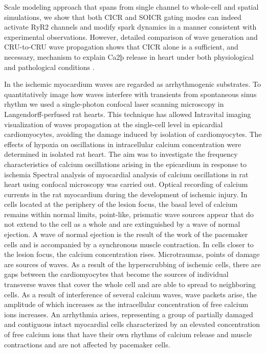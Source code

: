 \documentclass{biophys-new}
\begin{document}
Scale modeling approach that spans from single channel to whole-cell and spatial
simulations, we show that both CICR and SOICR gating modes can indeed activate RyR2 channels and modify  spark dynamics in a manner consistent
with experimental observations.
However, detailed comparison of  wave
generation and CRU-to-CRU  wave propagation shows that CICR alone
is a sufficient, and necessary, mechanism to explain Ca2þ release in heart under
both physiological and pathological conditions
\cite{williams2017does}.


In the ischemic myocardium  waves are regarded as arrhythmogenic substrates.
To quantitatively image how  waves interfere with  transients from spontaneous sinus rhythm we used a single-photon confocal laser scanning microscopy in Langendorff-perfused rat hearts.
This technique has allowed Intravital imaging visualization of  waves propagation at the single-cell level in epicardial cardiomyocytes, avoiding the damage induced by isolation of cardiomyocytes.
The effects of hypoxia on oscillations in intracellular calcium concentration  were determined in isolated rat heart.
The aim was to investigate the frequency characteristics of calcium oscillations arising in the epicardium in response to ischemia
Spectral  analysis of myocardial analysis of calcium oscillations in rat heart using confocal microscopy was carried out.
Optical recording of calcium currents in the rat myocardium during the development of ischemic injury.
In cells located at the periphery of the lesion focus, the basal level of calcium remains within normal limits, point-like, prismatic wave sources appear that do not extend to the cell as a whole and are extinguished by a wave of normal ejection.
A wave of normal ejection is the result of the work of the pacemaker cells and is accompanied by a synchronous muscle contraction.
In cells closer to the lesion focus, the calcium concentration rises.
Microtraumas, points of damage are sources of waves.
As a result of the hyperscrubbing of ischemic cells, there are gaps between the cardiomyocytes that become the sources of individual transverse waves that cover the whole cell and are able to spread to neighboring cells.
As a result of interference of several calcium waves, wave packets arise, the amplitude of which increases as the intracellular concentration of free calcium ions increases.
An arrhythmia arises, representing a group of partially damaged and contiguous intact myocardial cells characterized by an elevated concentration of free calcium ions that have their own rhythms of calcium release and muscle contractions and are not affected by pacemaker cells.
\end{document}
